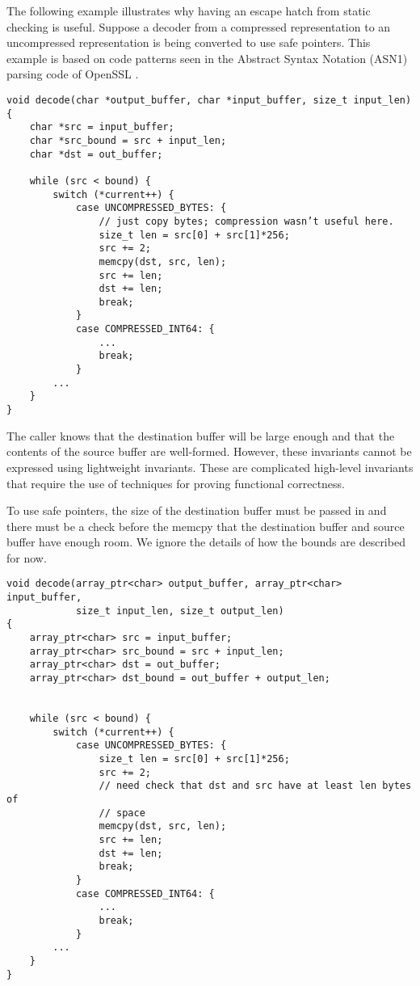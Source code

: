 The following example illustrates why having an escape hatch from static
checking is useful. Suppose a decoder from a compressed representation
to an uncompressed representation is being converted to use safe
pointers. This example is based on code patterns seen in the Abstract
Syntax Notation (ASN1) parsing code of OpenSSL \cite{OpenSSL2015}.

\begin{verbatim}
void decode(char *output_buffer, char *input_buffer, size_t input_len)
{
    char *src = input_buffer;
    char *src_bound = src + input_len;
    char *dst = out_buffer;

    while (src < bound) {
        switch (*current++) {
            case UNCOMPRESSED_BYTES: { 
                // just copy bytes; compression wasn’t useful here.
                size_t len = src[0] + src[1]*256;
                src += 2;
                memcpy(dst, src, len);
                src += len;
                dst += len;
                break;
            }
            case COMPRESSED_INT64: {
                ...
                break;
            }
        ...
    }
}
\end{verbatim}

The caller knows that the destination buffer will be large enough and
that the contents of the source buffer are well-formed. However, these
invariants cannot be expressed using lightweight invariants. These are
complicated high-level invariants that require the use of techniques for
proving functional correctness.

To use safe pointers, the size of the destination buffer must be passed
in and there must be a check before the memcpy that the destination
buffer and source buffer have enough room. We ignore the details of how
the bounds are described for now.

\begin{verbatim}
void decode(array_ptr<char> output_buffer, array_ptr<char> input_buffer, 
            size_t input_len, size_t output_len)
{
    array_ptr<char> src = input_buffer;
    array_ptr<char> src_bound = src + input_len;
    array_ptr<char> dst = out_buffer;
    array_ptr<char> dst_bound = out_buffer + output_len;


    while (src < bound) {
        switch (*current++) {
            case UNCOMPRESSED_BYTES: { 
                size_t len = src[0] + src[1]*256;
                src += 2;
                // need check that dst and src have at least len bytes of
                // space
                memcpy(dst, src, len);
                src += len;
                dst += len;                
                break;
            }
            case COMPRESSED_INT64: {
                ...
                break;
            }
        ...
    }
}
\end{verbatim}


